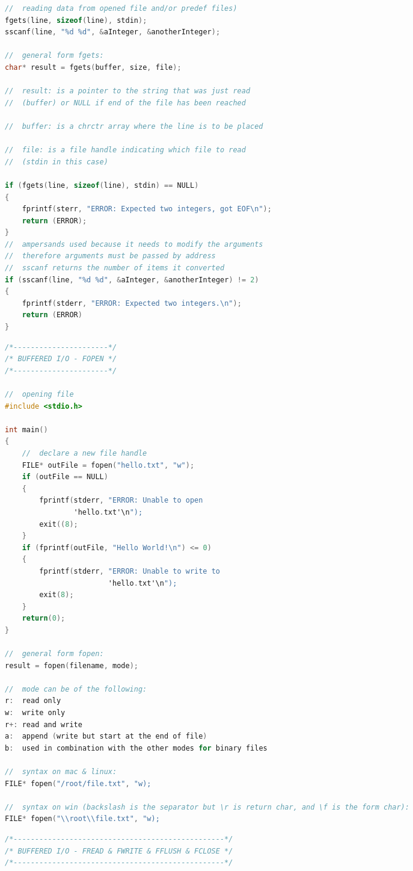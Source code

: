 \documentclass[8pt]{extarticle}
\begin{document}
\begin{small}
\begin{multicols}{2}
\begin{lstlisting}[language=C]
//  reading data from opened file and/or predef files)
fgets(line, sizeof(line), stdin);
sscanf(line, "%d %d", &aInteger, &anotherInteger);

//  general form fgets:
char* result = fgets(buffer, size, file);

//  result: is a pointer to the string that was just read 
//  (buffer) or NULL if end of the file has been reached

//  buffer: is a chrctr array where the line is to be placed

//  file: is a file handle indicating which file to read
//  (stdin in this case)

if (fgets(line, sizeof(line), stdin) == NULL)
{
	fprintf(sterr, "ERROR: Expected two integers, got EOF\n");
	return (ERROR);
}
//  ampersands used because it needs to modify the arguments 
//  therefore arguments must be passed by address
//  sscanf returns the number of items it converted
if (sscanf(line, "%d %d", &aInteger, &anotherInteger) != 2)
{
	fprintf(stderr, "ERROR: Expected two integers.\n");
	return (ERROR)
}
\end{lstlisting}

\begin{lstlisting}[language=C]
/*----------------------*/
/* BUFFERED I/O - FOPEN */
/*----------------------*/

//  opening file
#include <stdio.h>

int main()
{
	//  declare a new file handle
	FILE* outFile = fopen("hello.txt", "w");
	if (outFile == NULL)
	{
		fprintf(stderr, "ERROR: Unable to open 
				'hello.txt'\n");
		exit((8);
	}
	if (fprintf(outFile, "Hello World!\n") <= 0)
	{
		fprintf(stderr, "ERROR: Unable to write to 
						'hello.txt'\n");
		exit(8);
	}
	return(0);
}

//  general form fopen:
result = fopen(filename, mode);

//  mode can be of the following:
r:	read only
w:	write only
r+:	read and write
a:	append (write but start at the end of file)
b:	used in combination with the other modes for binary files

//  syntax on mac & linux:
FILE* fopen("/root/file.txt", "w);

//  syntax on win (backslash is the separator but \r is return char, and \f is the form char):
FILE* fopen("\\root\\file.txt", "w);
\end{lstlisting}


\begin{lstlisting}[language=C]
/*-------------------------------------------------*/
/* BUFFERED I/O - FREAD & FWRITE & FFLUSH & FCLOSE */
/*-------------------------------------------------*/


\end{lstlisting}
\end{multicols}
\end{small}
\end{document}
